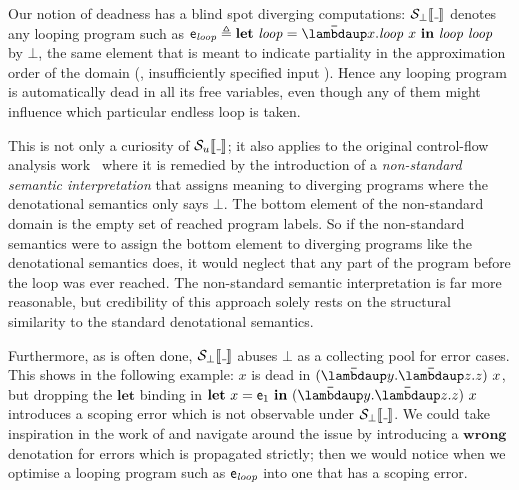 Our notion of deadness has a blind spot \wrt diverging computations:
$\semscott{\wild}$ denotes any looping program such as
$\pe_{\mathit{loop}} \triangleq \Let{\mathit{loop}}{\Lam{x}{\mathit{loop}~x}}{{\mathit{loop}~\mathit{loop}}}$ by $\bot$, the
same element that is meant to indicate partiality in the approximation order
of the domain (\eg, insufficiently specified input%
%
%
).
Hence any looping program is automatically dead in all its free variables, even
though any of them might influence which particular endless loop is taken.

This is not only a curiosity of $\semusg{\wild}$; it also applies to the original
control-flow analysis work~\citep[p. 23]{Shivers:91} where it is remedied
by the introduction of a \emph{non-standard semantic interpretation} that
assigns meaning to diverging programs where the denotational semantics only
says $\bot$.
The bottom element of the non-standard domain is the empty set of reached
program labels. So if the non-standard semantics were to assign the bottom
element to diverging programs like the denotational semantics does, it would
neglect that any part of the program before the loop was ever reached.
The non-standard semantic interpretation is far more reasonable, but credibility
of this approach solely rests on the structural similarity to the standard
denotational semantics.

Furthermore, as is often done, $\semscott{\wild}$ abuses $\bot$ as a collecting
pool for error cases.
This shows in the following example:
$x$ is dead in $(\Lam{y}{\Lam{z}{z}})~x$, but dropping the $\mathbf{let}$
binding in $\Let{x}{\pe_1}{(\Lam{y}{\Lam{z}{z}})~x}$
introduces a scoping error which is not observable under $\semscott{\wild}$.
We could take inspiration in the work of \citet{Milner:78}
and navigate around the issue by introducing a $\mathbf{wrong}$ denotation for
errors which is propagated strictly; then we would notice when we optimise a
looping program such as $\mathsf{e}_{\mathit{loop}}$ into one that has a scoping error.

